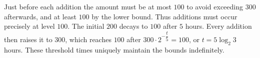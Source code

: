 Just before each addition the amount must be at most $100$ to avoid exceeding $300$ afterwards, and at least $100$ by the lower bound. Thus additions must occur precisely at level $100$. The initial $200$ decays to $100$ after $\boxed5$ hours. Every addition then raises it to $300$, which reaches $100$ after $300\cdot2^{-\dfrac{t}{5}}=100$, or $\boxed{t=5\log_2 3}$ hours. These threshold times uniquely maintain the bounds indefinitely.
